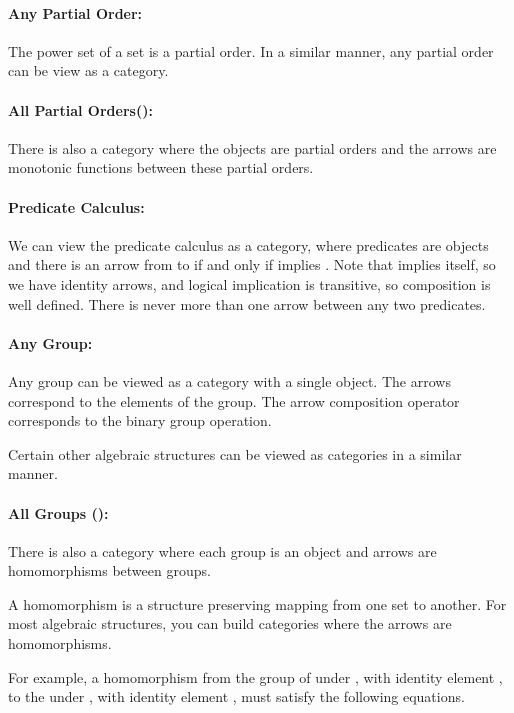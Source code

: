 \documentclass{seminar}
\begin{document}
\begin{slide}
\paragraph{Any Partial Order:}  The power
set of a
set is a partial order.  In a similar manner, any partial order can be
view as
a category.

\paragraph{All Partial Orders():}
There is also a category where the objects
are partial orders and the arrows are monotonic functions between
these partial orders.

\newslide

\paragraph{Predicate Calculus:}  We can view the predicate
calculus as a category, where predicates
are objects and there is an arrow from  to  if and only
if
 implies .  Note that  implies itself, so we have
identity
arrows, and logical implication is transitive, so composition is
well
defined.  There is never more than one arrow between any two
predicates.

\newslide

\paragraph{Any Group:}  Any group can be viewed as a category with
a single object.  The arrows correspond to the elements of the
group.
The arrow composition operator corresponds to the binary group
operation.

Certain other algebraic structures can be viewed as categories in
a
similar manner.

\paragraph{All Groups ():}  There is also
a category where each group
is an object and arrows are homomorphisms between groups.

\newslide

A homomorphism is a structure preserving mapping from one set to
another.
For most algebraic structures, you can build categories where
the arrows are homomorphisms.

For example, a homomorphism  from the group of 
under , with identity element , to the
 under , with identity
element , must satisfy the following equations.


\end{slide}
\end{document}
